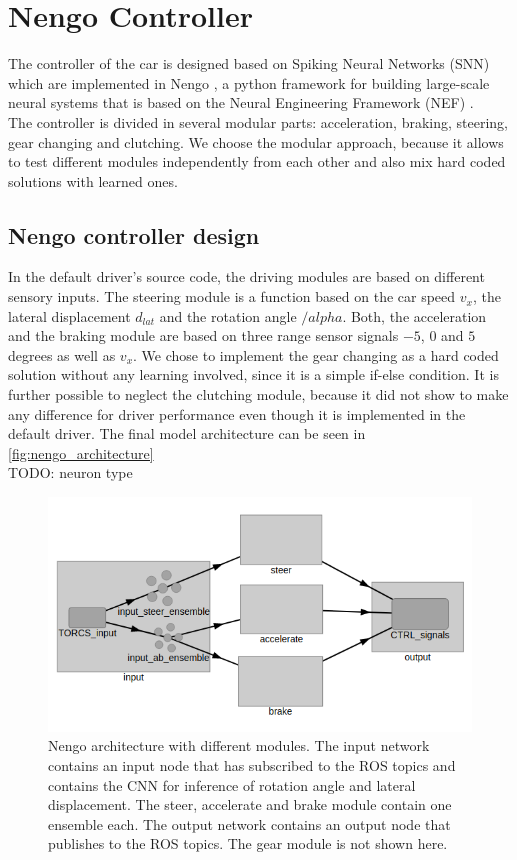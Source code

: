 \documentclass[10pt,a4paper,twoside,journal]{IEEEtran}
\begin{document}
\section{Nengo Controller}
\label{sc:controller}
The controller of the car is designed based on Spiking Neural Networks (SNN) which are implemented in Nengo \cite{nengo}, a python framework for building large-scale neural systems that is based on the Neural Engineering Framework (NEF) \cite{nef}. \\
The controller is divided in several modular parts: acceleration, braking, steering, gear changing and clutching. We choose the modular approach, because it allows to test different modules independently from each other and also mix hard coded solutions with learned ones.

\subsection{Nengo controller design}
In the default driver's source code, the driving modules are based on different sensory inputs. The steering module is a function based on the car speed $v_x$, the lateral displacement $d_{lat}$ and the rotation angle $/alpha$. Both, the acceleration and the braking module are based on three range sensor signals $-5$, $0$ and $5$ degrees as well as $v_x$. We chose to implement the gear changing as a hard coded solution without any learning involved, since it is a simple if-else condition. It is further possible to neglect the clutching module, because it did not show to make any difference for driver performance even though it is implemented in the default driver. The final model architecture can be seen in \autoref{fig:nengo_architecture}\\
TODO: neuron type
\begin{figure}[ht]
	\centering
	\includegraphics[width=\columnwidth]{attachments/nengo_architecture.png}
	\caption{Nengo architecture with different modules. The input network contains an input node that has subscribed to the ROS topics and contains the CNN for inference of rotation angle and lateral displacement. The steer, accelerate and brake module contain one ensemble each. The output network contains an output node that publishes to the ROS topics. The gear module is not shown here.}
	\label{fig:nengo_architecture}
\end{figure}
\end{document}
